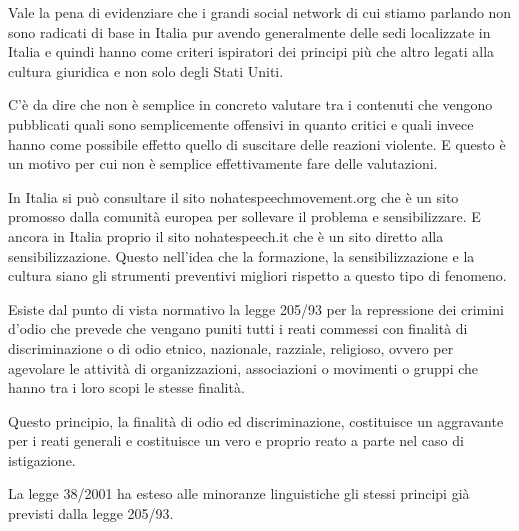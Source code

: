  Vale la pena di evidenziare che i grandi social network di cui stiamo parlando non sono radicati di base in Italia pur avendo generalmente delle sedi localizzate in Italia e quindi hanno come criteri ispiratori dei principi più che altro legati alla cultura giuridica e non solo degli Stati Uniti.\par
 C'è da dire che non è semplice in concreto valutare tra i contenuti che vengono pubblicati quali sono semplicemente offensivi in quanto critici e quali invece hanno come possibile effetto quello di suscitare delle reazioni violente. E questo è un motivo per cui non è semplice effettivamente fare delle valutazioni. \par
 In Italia si può consultare il sito nohatespeechmovement.org che è un sito promosso dalla comunità europea per sollevare il problema e sensibilizzare. E ancora in Italia proprio il sito nohatespeech.it che è un sito diretto alla sensibilizzazione. Questo nell'idea che la formazione, la sensibilizzazione e la cultura siano gli strumenti preventivi migliori rispetto a questo tipo di fenomeno.\par
 Esiste dal punto di vista normativo la legge 205/93 per la repressione dei crimini d'odio che prevede che vengano puniti tutti i reati commessi con finalità di discriminazione o di odio etnico, nazionale, razziale, religioso, ovvero per agevolare le attività di organizzazioni, associazioni o movimenti o gruppi che hanno tra i loro scopi le stesse finalità.\par
 Questo principio, la finalità di odio ed discriminazione, costituisce un aggravante per i reati generali e costituisce un vero e proprio reato a parte nel caso di istigazione.\par
 La legge 38/2001 ha esteso alle minoranze linguistiche gli stessi principi già previsti dalla legge 205/93.\par
 
